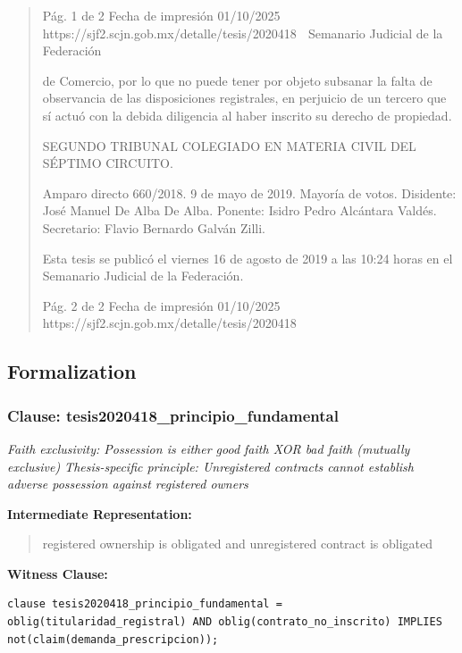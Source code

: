 \documentclass[11pt,a4paper]{article}
\begin{document}
\begin{quote}
                                               Pág. 1 de 2              Fecha de impresión 01/10/2025
  https://sjf2.scjn.gob.mx/detalle/tesis/2020418
                                                  Semanario Judicial de la Federación

de Comercio, por lo que no puede tener por objeto subsanar la falta de observancia de las
disposiciones registrales, en perjuicio de un tercero que sí actuó con la debida diligencia al haber
inscrito su derecho de propiedad.

SEGUNDO TRIBUNAL COLEGIADO EN MATERIA CIVIL DEL SÉPTIMO CIRCUITO.


Amparo directo 660/2018. 9 de mayo de 2019. Mayoría de votos. Disidente: José Manuel De Alba
De Alba. Ponente: Isidro Pedro Alcántara Valdés. Secretario: Flavio Bernardo Galván Zilli.


Esta tesis se publicó el viernes 16 de agosto de 2019 a las 10:24 horas en el Semanario Judicial
de la Federación.




                                             Pág. 2 de 2            Fecha de impresión 01/10/2025
 https://sjf2.scjn.gob.mx/detalle/tesis/2020418

\end{quote}

\subsection{Formalization}

\subsubsection{Clause: tesis2020418\_principio\_fundamental}

\textit{Faith exclusivity: Possession is either good faith XOR bad faith (mutually exclusive) Thesis-specific principle: Unregistered contracts cannot establish adverse possession against registered owners}

\textbf{Intermediate Representation:}

\begin{quote}
registered ownership is obligated and unregistered contract is obligated
\end{quote}

\textbf{Witness Clause:}

\begin{lstlisting}[style=witnessstyle, language=Witness]
clause tesis2020418_principio_fundamental = oblig(titularidad_registral) AND oblig(contrato_no_inscrito) IMPLIES not(claim(demanda_prescripcion));
\end{lstlisting}
\end{document}

